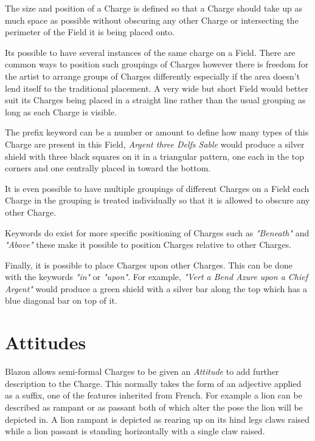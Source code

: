 The size and position of a Charge is defined so that a Charge should take up as much space as possible without obscuring any other Charge or intersecting the perimeter of the Field it is being placed onto.  

Its possible to have several instances of the same charge on a Field. There are common ways to position such groupings of Charges however there is freedom for the artist to arrange groups of Charges differently especially if the area doesn't lend itself to the traditional placement.  A very wide but short Field would better suit its Charges being placed in a straight line rather than the usual grouping as long as each Charge is visible. 


The prefix keyword can be a number or amount to define how many types of this Charge are present in this Field, \emph{Argent three Delfs Sable} would produce a silver shield with three black squares on it in a triangular pattern, one each in the  top corners and one centrally placed in toward the bottom. 

It is even possible to have multiple groupings of different Charges on a Field each Charge in the grouping is treated individually so that it is allowed to obscure any other Charge.  

Keywords do exist for more specific positioning of Charges such as \emph{"Beneath"} and \emph{"Above"} these make it possible to position Charges relative to other Charges.

Finally, it is possible to place Charges upon other Charges.  This can be done with the keywords \emph{"in"} or \emph{"upon"}. For example, \emph{"Vert a Bend Azure upon a Chief Argent"} would produce a green shield with a silver bar along the top which has a blue diagonal bar on top of it.

\section{Attitudes}
Blazon allows semi-formal Charges to be given an \emph{Attitude} to add further description to the Charge.  This normally takes the form of an adjective applied as a suffix, one of the features inherited from French.  For example a lion can be described as rampant or as passant both of which alter the pose the lion will be depicted in.  A lion rampant is depicted as rearing up on its hind legs claws raised while a lion passant is standing horizontally with a single claw raised. 


